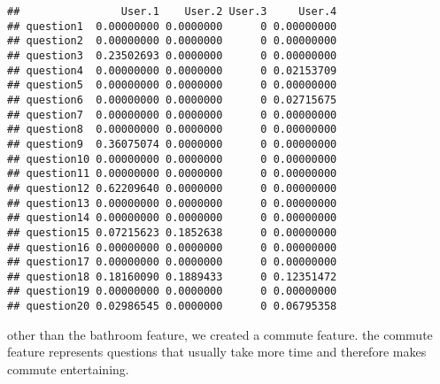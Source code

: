 \documentclass[]{article}
\begin{document}
\begin{verbatim}
##                User.1    User.2 User.3     User.4
## question1  0.00000000 0.0000000      0 0.00000000
## question2  0.00000000 0.0000000      0 0.00000000
## question3  0.23502693 0.0000000      0 0.00000000
## question4  0.00000000 0.0000000      0 0.02153709
## question5  0.00000000 0.0000000      0 0.00000000
## question6  0.00000000 0.0000000      0 0.02715675
## question7  0.00000000 0.0000000      0 0.00000000
## question8  0.00000000 0.0000000      0 0.00000000
## question9  0.36075074 0.0000000      0 0.00000000
## question10 0.00000000 0.0000000      0 0.00000000
## question11 0.00000000 0.0000000      0 0.00000000
## question12 0.62209640 0.0000000      0 0.00000000
## question13 0.00000000 0.0000000      0 0.00000000
## question14 0.00000000 0.0000000      0 0.00000000
## question15 0.07215623 0.1852638      0 0.00000000
## question16 0.00000000 0.0000000      0 0.00000000
## question17 0.00000000 0.0000000      0 0.00000000
## question18 0.18160090 0.1889433      0 0.12351472
## question19 0.00000000 0.0000000      0 0.00000000
## question20 0.02986545 0.0000000      0 0.06795358
\end{verbatim}

other than the bathroom feature, we created a commute feature. the
commute feature represents questions that usually take more time and
therefore makes commute entertaining.
\end{document}
